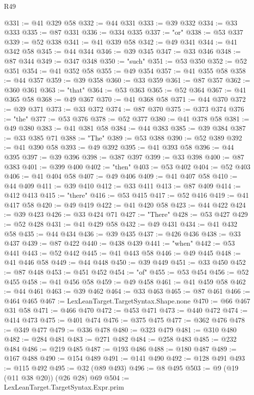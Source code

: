 \begin{lexlean}{R49}
\begin{coremodule}
@331 := @41 @329 @58
@332 := @44 @331
@333 := @39 @332
@334 := @33 @333
@335 := @87 @331
@336 := @334 @335
@337 := "or"
@338 := @53 @337
@339 := @52 @338
@341 := @41 @339 @58
@342 := @49 @341
@344 := @41 @342 @58
@345 := @44 @344
@346 := @39 @345
@347 := @33 @346
@348 := @87 @344
@349 := @347 @348
@350 := "such"
@351 := @53 @350
@352 := @52 @351
@354 := @41 @352 @58
@355 := @49 @354
@357 := @41 @355 @58
@358 := @44 @357
@359 := @39 @358
@360 := @33 @359
@361 := @87 @357
@362 := @360 @361
@363 := "that"
@364 := @53 @363
@365 := @52 @364
@367 := @41 @365 @58
@368 := @49 @367
@370 := @41 @368 @58
@371 := @44 @370
@372 := @39 @371
@373 := @33 @372
@374 := @87 @370
@375 := @373 @374
@376 := "the"
@377 := @53 @376
@378 := @52 @377
@380 := @41 @378 @58
@381 := @49 @380
@383 := @41 @381 @58
@384 := @44 @383
@385 := @39 @384
@387 := @33 @385 @71
@388 := "The"
@389 := @53 @388
@390 := @52 @389
@392 := @41 @390 @58
@393 := @49 @392
@395 := @41 @393 @58
@396 := @44 @395
@397 := @39 @396
@398 := @387 @397
@399 := @33 @398
@400 := @87 @383
@401 := @399 @400
@402 := "then"
@403 := @53 @402
@404 := @52 @403
@406 := @41 @404 @58
@407 := @49 @406
@409 := @41 @407 @58
@410 := @44 @409
@411 := @39 @410
@412 := @33 @411
@413 := @87 @409
@414 := @412 @413
@415 := "there"
@416 := @53 @415
@417 := @52 @416
@419 := @41 @417 @58
@420 := @49 @419
@422 := @41 @420 @58
@423 := @44 @422
@424 := @39 @423
@426 := @33 @424 @71
@427 := "There"
@428 := @53 @427
@429 := @52 @428
@431 := @41 @429 @58
@432 := @49 @431
@434 := @41 @432 @58
@435 := @44 @434
@436 := @39 @435
@437 := @426 @436
@438 := @33 @437
@439 := @87 @422
@440 := @438 @439
@441 := "when"
@442 := @53 @441
@443 := @52 @442
@445 := @41 @443 @58
@446 := @49 @445
@448 := @41 @446 @58
@449 := @44 @448
@450 := @39 @449
@451 := @33 @450
@452 := @87 @448
@453 := @451 @452
@454 := "of"
@455 := @53 @454
@456 := @52 @455
@458 := @41 @456 @58
@459 := @49 @458
@461 := @41 @459 @58
@462 := @44 @461
@463 := @39 @462
@464 := @33 @463
@465 := @87 @461
@466 := @464 @465
@467 := LexLeanTarget.TargetSyntax.Shape.none
@470 := @66 @467 @31 @58
@471 := @466 @470
@472 := @453 @471
@473 := @440 @472
@474 := @414 @473
@475 := @401 @474
@476 := @375 @475
@477 := @362 @476
@478 := @349 @477
@479 := @336 @478
@480 := @323 @479
@481 := @310 @480
@482 := @284 @481
@483 := @271 @482
@484 := @258 @483
@485 := @232 @484
@486 := @219 @485
@487 := @193 @486
@488 := @180 @487
@489 := @167 @488
@490 := @154 @489
@491 := @141 @490
@492 := @128 @491
@493 := @115 @492
@495 := @32 (@89 @493)
@496 := @8 @495
@503 := @9 (@19 (@11 @38 @20)) (@26 @28) @69
@504 := LexLeanTarget.TargetSyntax.Expr.prim

\end{coremodule}
\end{lexlean}
